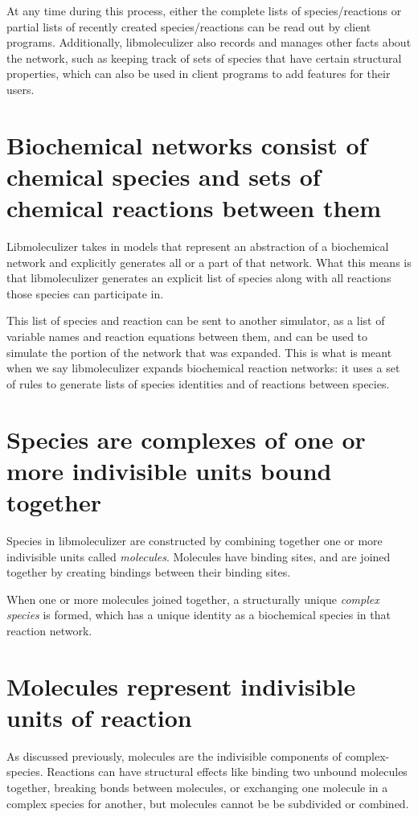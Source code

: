 At any time during this process, either the complete lists of
species/reactions or partial lists of recently created
species/reactions can be read out by client programs.  Additionally,
libmoleculizer also records and manages other facts about the network,
such as keeping track of sets of species that have certain structural
properties, which can also be used in client programs to add features
for their users.

\section{Biochemical networks consist of chemical species and sets of
  chemical  reactions between them}
Libmoleculizer takes in models that represent an abstraction of a
biochemical network and explicitly generates all or a part of that
network.  What this means is that libmoleculizer generates an explicit
list of species along with all reactions those species can participate
in.  

This list of species and reaction can be sent to another simulator, as
a list of variable names and reaction equations between them, and can
be used to simulate the portion of the network that was expanded.
This is what is meant when we say libmoleculizer expands biochemical
reaction networks: it uses a set of rules to generate lists of species
identities and of reactions between species.

\section{Species are complexes of one or more indivisible units bound together}

Species in libmoleculizer are constructed by combining together one or
more indivisible units called {\it molecules}.  Molecules have binding
sites, and are joined together by creating bindings between their
binding sites.  

When one or more molecules joined together, a structurally unique
{\it complex species} is formed, which has a unique identity as a biochemical
species in that reaction network.

\section{Molecules represent indivisible units of reaction}
As discussed previously, molecules are the indivisible components of
complex-species.  Reactions can have structural effects like binding two
unbound molecules together, breaking bonds between molecules, or
exchanging one molecule in a complex species for another, but
molecules cannot be be subdivided or combined. 

